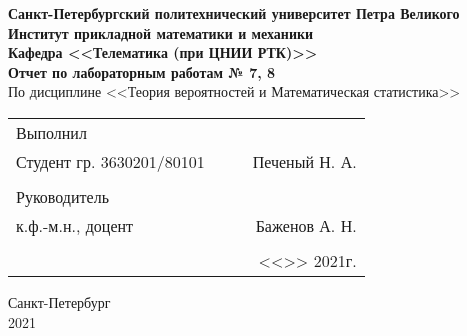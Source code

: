 \documentclass[12pt]{article}
\begin{document}
\begin{titlepage}
	\begin{center}
		\hfill \break
		{\textbf{Санкт-Петербургский политехнический университет Петра Великого}}\\
		\hfill \break
		\textbf{Институт прикладной математики и механики}\\
		\hfill \break
		\textbf{Кафедра <<Телематика (при ЦНИИ РТК)>>}\\
		\vfill
		\large{\bfseries Отчет по лабораторным работам № 7, 8}\\
		\hfill \break
		\hfill \break
		\hfill \break
		\hfill \break
		По дисциплине <<Теория вероятностей и Математическая статистика>>\\
		\hfill \break
		\hfill \break
		\hfill \break
	\end{center}
 
	\normalsize
	{ 
		\begin{tabular}{lp{2cm}cr}
			Выполнил &&&\\
			Студент гр. 3630201/80101&&\underline{\hspace{1.5cm}}& Печеный Н. А.\\\\
			Руководитель&&&\\ 
			к.ф.-м.н., доцент && \underline{\hspace{1.5cm}}& Баженов А. Н. \\\\
			&&&<<\underline{\phantom{333}}>>\underline{\phantom{сентября000}}
			2021г.
		\end{tabular}
	}
\vfill

\begin{center} Санкт-Петербург \\2021 \end{center}
\end{titlepage}

\newpage

\setcounter{page}{2}

\setlength{\parindent}{1cm}

\tableofcontents

\newpage

\listoftables

\newpage
\end{document}
